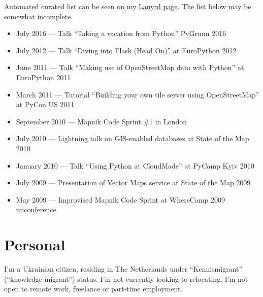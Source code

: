 \documentclass[margin]{res}
\begin{document}
\begin{resume}
Automated curated list can be seen on my
\href{http://lanyrd.com/profile/mishok13/sessions/}{Lanyrd page}.  The
list below may be somewhat incomplete.

\begin{itemize}
\item July 2016 --- Talk ``Taking a vacation from Python'' PyGrunn 2016
\item July 2012 --- Talk ``Diving into Flask (Head On)'' at EuroPython 2012
\item June 2011 --- Talk ``Making use of OpenStreetMap data with Python'' at EuroPython 2011
\item March 2011 --- Tutorial ``Building your own tile server using OpenStreetMap'' at PyCon US 2011
\item September 2010 --- Mapnik Code Sprint \#1 in London
\item July 2010 --- Lightning talk on GIS-enabled databases at State of the Map 2010
\item January 2010 --- Talk ``Using Python at CloudMade'' at PyCamp Kyiv 2010
\item July 2009 --- Presentation of Vector Maps service at State of the Map 2009
\item May 2009 --- Improvised Mapnik Code Sprint at WhereCamp 2009 unconference
\end{itemize}

\section{Personal}

I'm a Ukrainian citizen, residing in The Netherlands under ``Kennismigrant'' (``knowledge migrant'') status. I'm not currently looking to relocating. I'm not open to remote work, freelance or part-time employment.

\end{resume}
\end{document}
